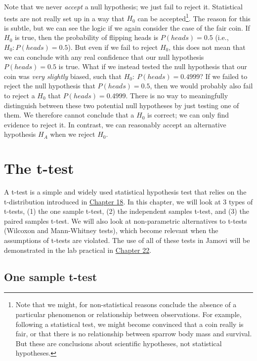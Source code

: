 \documentclass[
]{scrbook}
\begin{document}
Note that we never \emph{accept} a null hypothesis; we just fail to reject it.
Statistical tests are not really set up in a way that \(H_{0}\) can be accepted\footnote{Note that we might, for non-statistical reasons conclude the absence of a particular phenomenon or relationship between observations. For example, following a statistical test, we might become convinced that a coin really is fair, or that there is no relationship between sparrow body mass and survival. But these are conclusions about scientific hypotheses, not statistical hypotheses.}.
The reason for this is subtle, but we can see the logic if we again consider the case of the fair coin.
If \(H_{0}\) is true, then the probability of flipping heads is \(P(heads) = 0.5\) (i.e., \(H_{0}: P(heads) = 0.5\)).
But even if we fail to reject \(H_{0}\), this does not mean that we can conclude with any real confidence that our null hypothesis \(P(heads) = 0.5\) is true.
What if we instead tested the null hypothesis that our coin was \emph{very slightly} biased, such that \(H_{0}:\:P(heads) = 0.4999\)?
If we failed to reject the null hypothesis that \(P(heads) = 0.5\), then we would probably also fail to reject a \(H_{0}\) that \(P(heads) = 0.4999\).
There is no way to meaningfully distinguish between these two potential null hypotheses by just testing one of them.
We therefore cannot conclude that a \(H_{0}\) is correct; we can only find evidence to reject it.
In contrast, we can reasonably accept an alternative hypothesis \(H_{A}\) when we reject \(H_{0}\).

\hypertarget{Chapter_21}{%
\chapter{The t-test}\label{Chapter_21}}

A t-test is a simple and widely used statistical hypothesis test that relies on the t-distribution introduced in \protect\hyperlink{Chapter_18}{Chapter 18}.
In this chapter, we will look at 3 types of t-tests, (1) the one sample t-test, (2) the independent samples t-test, and (3) the paired samples t-test.
We will also look at non-parametric alternatives to t-tests (Wilcoxon and Mann-Whitney tests), which become relevant when the assumptions of t-tests are violated.
The use of all of these tests in Jamovi will be demonstrated in the lab practical in \protect\hyperlink{Chapter_22}{Chapter 22}.

\hypertarget{one-sample-t-test}{%
\section{One sample t-test}\label{one-sample-t-test}}
\end{document}
